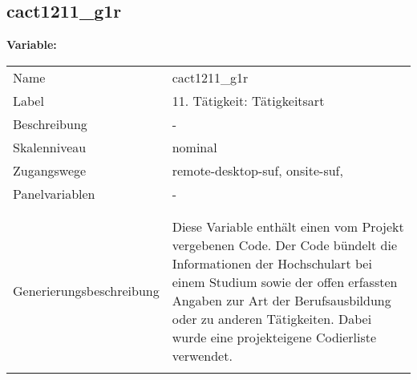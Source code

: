 	
	
	\subsection{cact1211\_g1r}
	\label{subSection:cact1211_g1r}

	\noindent\textbf{Variable:}\\
		\begin{tabular}{lL{11.3cm}}
			\label{tableVariable:cact1211_g1r}
			Name & cact1211\_g1r \\
			Label & 11. Tätigkeit: Tätigkeitsart \\
			Beschreibung & - \\
			Skalenniveau & nominal \\
			Zugangswege &
				remote-desktop-suf,
				onsite-suf,
 \\
			Panelvariablen & -
			 \\
			 \\
 \\
					Generierungsbeschreibung & Diese Variable enthält einen vom Projekt vergebenen Code. Der Code bündelt die  Informationen der Hochschulart bei einem Studium sowie der  offen erfassten Angaben zur Art der Berufsausbildung oder zu anderen Tätigkeiten. Dabei wurde eine projekteigene Codierliste verwendet.
				 \\	
			 \\
		\end{tabular}






